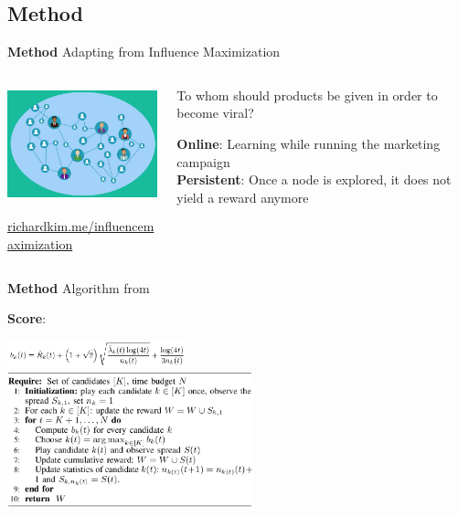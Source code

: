 \documentclass[10pt,frenchb]{beamer}
\begin{document}
\subsection{Method}

\begin{frame}{\textbf{Method} Adapting from Influence Maximization}


\begin{columns}
\begin{column}{0.6\textwidth}
\begin{center}
\includegraphics[height=125px]{images/influence.png}
\end{center}
\begin{center}\url{richardkim.me/influencemaximization}\end{center}
\end{column}

\begin{column}{0.4\textwidth}
\begin{center}To whom should products be given in order to become viral?\end{center}
\pause
\textbf{Online}: Learning while running the marketing campaign\\
\bigskip
\pause
\textbf{Persistent}: Once a node is explored, it does not yield a reward anymore
\end{column}
\end{columns}

\end{frame}

\begin{frame}{\textbf{Method} Algorithm from \cite{lagree2017effective}}

\textbf{Score}:
\begin{center}
\includegraphics[height=30px]{images/score.png}\\
\includegraphics[height=150px]{images/gt-ucb.png}
\end{center}

\end{frame}
\end{document}
